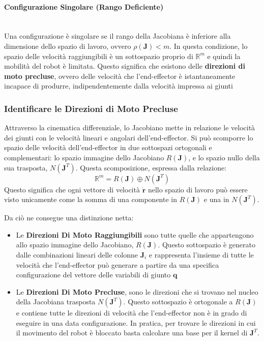﻿\documentclass[11pt, a4paper]{article}
\begin{document}
\paragraph{Configurazione Singolare (Rango Deficiente)}\mbox{}\\
Una configurazione è singolare se il rango della Jacobiana è inferiore alla dimensione dello spazio di lavoro, ovvero $\rho(\bm{J}) < m$. In questa condizione, lo spazio delle velocità raggiungibili è un sottospazio proprio di $\mathbb{R}^m$ e quindi la mobilità del robot è limitata. Questo significa che esistono delle \textbf{direzioni di moto precluse}, ovvero delle velocità che l'end-effector è istantaneamente incapace di produrre, indipendentemente dalla velocità impressa ai giunti

\subsubsection{Identificare le Direzioni di Moto Precluse}
Attraverso la cinematica differenziale, lo Jacobiano mette in relazione le velocità dei giunti con le velocità lineari e angolari dell'end-effector. Si può scomporre lo spazio delle velocità dell'end-effector in due sottospazi ortogonali e complementari: lo spazio immagine dello Jacobiano $R(\bm{J})$, e lo spazio nullo della sua trasposta, $N(\bm{J}^T)$. Questa scomposizione, espressa dalla relazione:
\[
    \mathbb{R}^m = R(\bm{J}) \oplus N(\bm{J}^T)
\]
Questo significa che ogni vettore di velocità $\dot{\bm{r}}$ nello spazio di lavoro può essere visto unicamente come la somma di una componente in $R(\bm{J})$ e una in $N(\bm{J}^T)$.

Da ciò ne consegue una distinzione netta:
\begin{itemize}
    \item Le \textbf{Direzioni Di Moto Raggiungibili} sono tutte quelle che appartengono allo spazio immagine dello Jacobiano, $R(\bm{J})$. Questo sottospazio è generato dalle combinazioni lineari delle colonne $\bm{J}_{i}$ e rappresenta l'insieme di tutte le velocità che l'end-effector può generare a partire da una specifica configurazione del vettore delle variabili di giunto \(\bm{q}\)
    \item Le \textbf{Direzioni Di Moto Precluse}, sono le direzioni che si trovano nel nucleo della Jacobiana trasposta $N(\bm{J}^T)$. Questo sottospazio è ortogonale a $R(\bm{J})$ e contiene tutte le direzioni di velocità che l'end-effector non è in grado di eseguire in una data configurazione. In pratica, per trovare le direzioni in cui il movimento del robot è bloccato basta calcolare una base per il kernel di $\bm{J}^T$.
\end{itemize}
\end{document}
